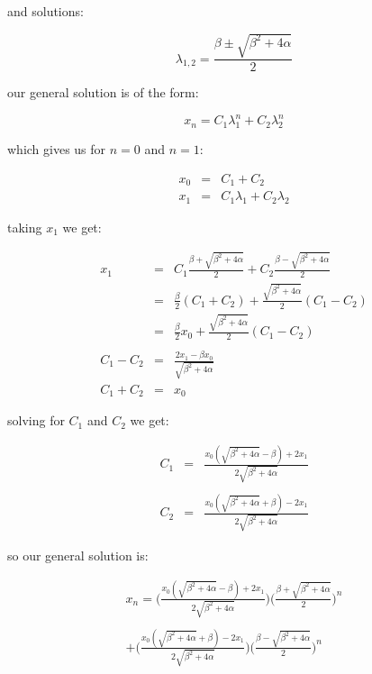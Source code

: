 \documentclass{report}
\begin{document}
and solutions: \bigskip

\[
    \lambda_{1, 2} = \frac{\beta \pm \sqrt{\beta^2 + 4 \alpha}}{2}
\]\medskip

our general solution is of the form: \bigskip

\[
    x_n = C_1 \lambda_1^n + C_2 \lambda_2^n
\]\medskip

which gives us for $n = 0$ and $n = 1$: \bigskip

\begin{eqnarray*}
    x_0 & = & C_1 + C_2 \\
    x_1 & = & C_1 \lambda_1 + C_2 \lambda_2
\end{eqnarray*}\medskip

taking $x_1$ we get: \bigskip

\begin{eqnarray*}
        x_1 & = & C_1 \frac{\beta + \sqrt{\beta^2 + 4 \alpha}}{2} + C_2 \frac{\beta - \sqrt{\beta^2 + 4 \alpha}}{2} \\
            & = & \frac{\beta}{2} (C_1 + C_2) + \frac{\sqrt{\beta^2 + 4 \alpha}}{2} (C_1 - C_2) \\
            & = & \frac{\beta}{2} x_0 + \frac{\sqrt{\beta^2 + 4 \alpha}}{2} (C_1 - C_2) \\\\
  C_1 - C_2 & = & \frac{2 x_1 - \beta x_0}{\sqrt{\beta^2 + 4 \alpha}} \\
  C_1 + C_2 & = & x_0
\end{eqnarray*}\medskip

solving for $C_1$ and $C_2$ we get: \bigskip

\begin{eqnarray*}
	C_1 & = & \frac{ x_0 (\sqrt{\beta^2 + 4 \alpha} - \beta) + 2 x_1  }{ 2 \sqrt{\beta^2 + 4 \alpha}  } \\\\
	C_2 & = & \frac{ x_0 (\sqrt{\beta^2 + 4 \alpha} + \beta) - 2 x_1  }{ 2 \sqrt{\beta^2 + 4 \alpha}  }
\end{eqnarray*}\medskip

so our general solution is: \bigskip

\begin{eqnarray*}
    x_n = \Bigg(\frac{x_0 (\sqrt{\beta^2 + 4 \alpha} - \beta) + 2 x_1}{2 \sqrt{\beta^2 + 4 \alpha}}\Bigg)
          \Bigg(\frac{\beta + \sqrt{\beta^2 + 4 \alpha}}{2}\Bigg)^n \\\\
          + \Bigg(\frac{x_0 (\sqrt{\beta^2 + 4 \alpha} + \beta) - 2 x_1}{2 \sqrt{\beta^2 + 4 \alpha}}\Bigg)
            \Bigg(\frac{\beta - \sqrt{\beta^2 + 4 \alpha}}{2}\Bigg)^n
\end{eqnarray*}\medskip
\end{document}
